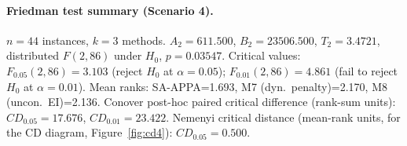 \paragraph{Friedman test summary (Scenario 4).}
$n=44$ instances, $k=3$ methods. $A_2=611.500$, $B_2=23506.500$, $T_2=3.4721$, distributed $F(2,86)$ under $H_0$, $p=0.03547$. Critical values: $F_{0.05}(2,86)=3.103$ (reject $H_0$ at $\alpha=0.05$); $F_{0.01}(2,86)=4.861$ (fail to reject $H_0$ at $\alpha=0.01$). Mean ranks: SA-APPA=1.693, M7 (dyn.\ penalty)=2.170, M8 (uncon.\ EI)=2.136. Conover post-hoc paired critical difference (rank-sum units): $CD_{0.05}=17.676$, $CD_{0.01}=23.422$. Nemenyi critical distance (mean-rank units, for the CD diagram, Figure~\ref{fig:cd4}): $CD_{0.05}=0.500$.
